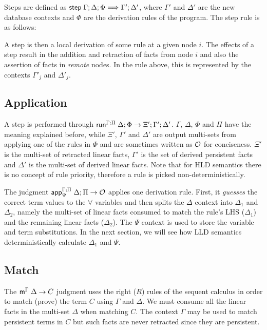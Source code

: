 Steps are defined as $\stepz \Gamma; \Delta; \Phi \Longrightarrow \Gamma';
\Delta'$, where $\Gamma'$ and $\Delta'$ are the new database contexts and $\Phi$
are the derivation rules of the program. The step rule is as follows:



A step is then a local derivation of some rule at a given node $i$. The effects
of a step result in the addition and retraction of facts from node $i$ and also
the assertion of facts in \emph{remote} nodes. In the rule above, this is
represented by the contexts $\Gamma'_j$ and $\Delta'_j$.

\subsection{Application}

A step is performed through
$\doz{\Gamma}{\Delta}{\Phi}{\Pi}{\Xi'}{\Gamma'}{\Delta'}$.  $\Gamma$, $\Delta$,
$\Phi$ and $\Pi$ have the meaning explained before, while $\Xi'$, $\Gamma'$ and
$\Delta'$ are output multi-sets from applying one of the rules in $\Phi$ and are
sometimes written as $\outsem$ for conciseness. $\Xi'$ is the multi-set of
retracted linear facts, $\Gamma'$ is the set of derived persistent facts and
$\Delta'$ is the multi-set of derived linear facts.  Note that for HLD semantics
there is no concept of rule priority, therefore a rule is picked
non-deterministically.

The judgment $\az{\Psi}{\Gamma}{\Delta}{\Pi}{A \lolli B}{\outsem}$ applies one
derivation rule. First, it \emph{guesses} the correct term values to the
$\forall$ variables and then splits the $\Delta$ context into $\Delta_1$ and
$\Delta_2$, namely the multi-set of linear facts consumed to match the rule's
LHS ($\Delta_1$) and the remaining linear facts ($\Delta_2$). The $\Psi$ context
is used to store the variable and term substitutions. In the next section,
we will see how LLD semantics deterministically calculate $\Delta_1$ and $\Psi$.



\subsection{Match}

The $\mz{\Gamma}{\Delta}{C}$ judgment uses the right ($R$) rules of the sequent
calculus in order to match (prove) the term $C$ using $\Gamma$ and $\Delta$. We
must consume all the linear facts in the multi-set $\Delta$ when matching $C$.
The context $\Gamma$ may be used to match persistent terms in $C$ but such facts
are never retracted since they are persistent.

